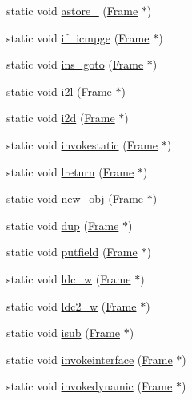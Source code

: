 \begin{DoxyCompactItemize}
\item 
static void \hyperlink{class_instruction_impl_a446f32fef14275611f9f4257031a7dfa}{astore\+\_} (\hyperlink{struct_frame}{Frame} $\ast$)
\item 
static void \hyperlink{class_instruction_impl_a8aeee354f98fe8300fc159ab675440df}{if\+\_\+icmpge} (\hyperlink{struct_frame}{Frame} $\ast$)
\item 
static void \hyperlink{class_instruction_impl_ab1ab9651bb431895e4022e16353b1393}{ins\+\_\+goto} (\hyperlink{struct_frame}{Frame} $\ast$)
\item 
static void \hyperlink{class_instruction_impl_adc46693dc12e0beeea147162e200c67c}{i2l} (\hyperlink{struct_frame}{Frame} $\ast$)
\item 
static void \hyperlink{class_instruction_impl_a8ac1b2ce48997ec5d5bdcbe424a97af8}{i2d} (\hyperlink{struct_frame}{Frame} $\ast$)
\item 
static void \hyperlink{class_instruction_impl_a1d155354287a5fa501cce5c39c341abc}{invokestatic} (\hyperlink{struct_frame}{Frame} $\ast$)
\item 
static void \hyperlink{class_instruction_impl_a21713baa2bc931118ad158180ba716a0}{lreturn} (\hyperlink{struct_frame}{Frame} $\ast$)
\item 
static void \hyperlink{class_instruction_impl_a612a030680b27c4dc97e6feec3abd9d5}{new\+\_\+obj} (\hyperlink{struct_frame}{Frame} $\ast$)
\item 
static void \hyperlink{class_instruction_impl_aaeaccd30bf6e716538a719935a73b059}{dup} (\hyperlink{struct_frame}{Frame} $\ast$)
\item 
static void \hyperlink{class_instruction_impl_ad561779f75082ceffc29cb00219c4a8b}{putfield} (\hyperlink{struct_frame}{Frame} $\ast$)
\item 
static void \hyperlink{class_instruction_impl_aeece337499bb42defdd5e3406c6f7d91}{ldc\+\_\+w} (\hyperlink{struct_frame}{Frame} $\ast$)
\item 
static void \hyperlink{class_instruction_impl_aa5f6887f392b6882d3786b8930c26d89}{ldc2\+\_\+w} (\hyperlink{struct_frame}{Frame} $\ast$)
\item 
static void \hyperlink{class_instruction_impl_a7e982b0571c9757bf7d9d6ce0036255b}{isub} (\hyperlink{struct_frame}{Frame} $\ast$)
\item 
static void \hyperlink{class_instruction_impl_a87ff225e6ed77e1a956d3c6a572e5352}{invokeinterface} (\hyperlink{struct_frame}{Frame} $\ast$)
\item 
static void \hyperlink{class_instruction_impl_a5786d278260f247e66a26a1006944ed7}{invokedynamic} (\hyperlink{struct_frame}{Frame} $\ast$)

\end{DoxyCompactItemize}

